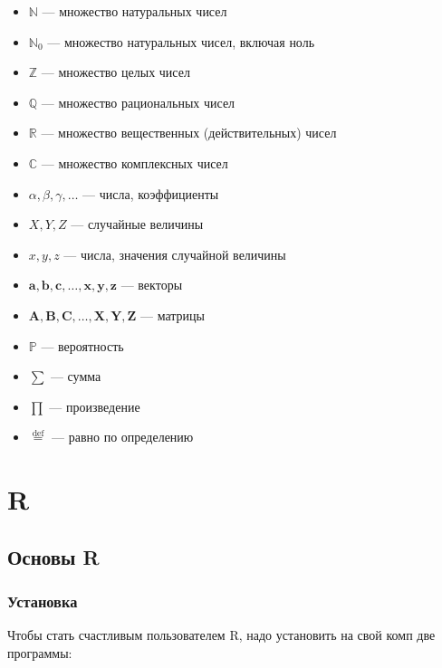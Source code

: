 \documentclass[
  letterpaper,
  DIV=11,
  numbers=noendperiod]{scrreprt}
\theoremstyle{definition}
\theoremstyle{remark}
\begin{document}
\begin{itemize}
\item
  \(\mathbb{N}\) --- множество натуральных чисел
\item
  \(\mathbb{N}_{0}\) --- множество натуральных чисел, включая ноль
\item
  \(\mathbb{Z}\) --- множество целых чисел
\item
  \(\mathbb{Q}\) --- множество рациональных чисел
\item
  \(\mathbb{R}\) --- множество вещественных (действительных) чисел
\item
  \(\mathbb{C}\) --- множество комплексных чисел
\item
  \(\alpha, \beta, \gamma, \dots\) --- числа, коэффициенты
\item
  \(X, Y, Z\) --- случайные величины
\item
  \(x, y, z\) --- числа, значения случайной величины
\item
  \(\mathbf{a}, \mathbf{b}, \mathbf{c}, \dots, \mathbf{x}, \mathbf{y}, \mathbf{z}\)
  --- векторы
\item
  \(\mathbf{A}, \mathbf{B}, \mathbf{C}, \dots, \mathbf{X}, \mathbf{Y}, \mathbf{Z}\)
  --- матрицы
\item
  \(\mathbb{P}\) --- вероятность
\item
  \(\sum\) --- сумма
\item
  \(\prod\) --- произведение
\item
  \(\overset{\text{def}}{=}\) --- равно по определению
\end{itemize}

\part{R}


\chapter{Основы R}\label{rbasics}

\section{Установка}\label{rbasics-rinstall}

Чтобы стать счастливым пользователем R, надо установить на свой комп две
программы:
\end{document}
